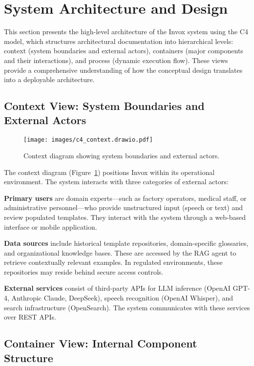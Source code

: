 \section{System Architecture and Design}
\label{sec:concept-design}

This section presents the high-level architecture of the Invox system using the C4 model, which structures architectural documentation into hierarchical levels: context (system boundaries and external actors), containers (major components and their interactions), and process (dynamic execution flow). These views provide a comprehensive understanding of how the conceptual design translates into a deployable architecture.

\subsection{Context View: System Boundaries and External Actors}
\label{subsec:context-view}

\begin{figure}[H]
  \centering
  \texttt{[image: images/c4\_context.drawio.pdf]}
  \caption{Context diagram showing system boundaries and external actors.}
  \label{fig:c4-context}
\end{figure}

The context diagram (Figure~\ref{fig:c4-context}) positions Invox within its operational environment. The system interacts with three categories of external actors:

\textbf{Primary users} are domain experts—such as factory operators, medical staff, or administrative personnel—who provide unstructured input (speech or text) and review populated templates. They interact with the system through a web-based interface or mobile application.

\textbf{Data sources} include historical template repositories, domain-specific glossaries, and organizational knowledge bases. These are accessed by the RAG agent to retrieve contextually relevant examples. In regulated environments, these repositories may reside behind secure access controls.

\textbf{External services} consist of third-party APIs for LLM inference (OpenAI GPT-4, Anthropic Claude, DeepSeek), speech recognition (OpenAI Whisper), and search infrastructure (OpenSearch). The system communicates with these services over REST APIs.

\subsection{Container View: Internal Component Structure}
\label{subsec:container-view}


